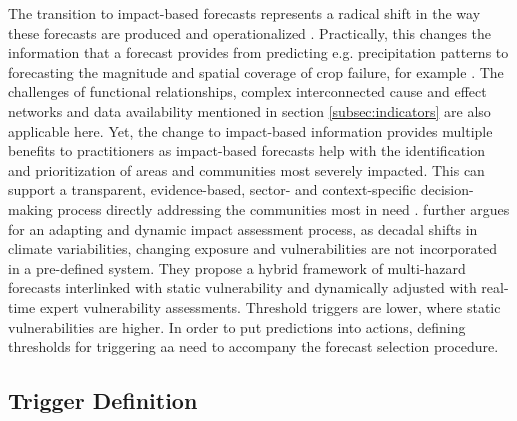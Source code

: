 The transition to impact-based forecasts represents a radical shift in the way these forecasts are produced and operationalized \autocite{ifrcFbFPractitionersManual2023}. Practically, this changes the information that a forecast provides from predicting e.g. precipitation patterns to forecasting the magnitude and spatial coverage of crop failure, for example \autocite{harrowsmithFutureForecastImpact2020}. The challenges of functional relationships, complex interconnected cause and effect networks and data availability mentioned in section \ref{subsec:indicators} are also applicable here. Yet, the change to impact-based information provides multiple benefits to practitioners as impact-based forecasts help with the identification and prioritization of areas and communities most severely impacted. This can support a transparent, evidence-based, sector- and context-specific decision-making process directly addressing the communities most in need \autocite{ifrcFbFPractitionersManual2023}.\newline
\Textcite{boultDroughtImpactbasedForecasting2022} further argues for an adapting and dynamic impact assessment process, as decadal shifts in climate variabilities, changing exposure and vulnerabilities are not incorporated in a pre-defined system. They propose a hybrid framework of multi-hazard forecasts interlinked with static vulnerability and dynamically adjusted with real-time expert vulnerability assessments. Threshold triggers are lower, where static vulnerabilities are higher. In order to put predictions into actions, defining thresholds for triggering \acrlong{aa} need to accompany the forecast selection procedure.

\subsection{Trigger Definition}\label{subsec:trigger}

